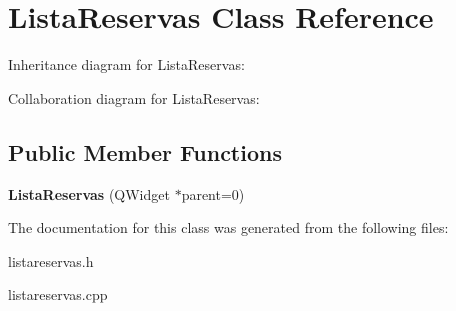 \hypertarget{classListaReservas}{}\section{Lista\+Reservas Class Reference}
\label{classListaReservas}


Inheritance diagram for Lista\+Reservas\+:


Collaboration diagram for Lista\+Reservas\+:
\subsection*{Public Member Functions}
\begin{DoxyCompactItemize}
\item 
{\bfseries Lista\+Reservas} (Q\+Widget $\ast$parent=0)\hypertarget{classListaReservas_ac68a4dbe8a07a1bae697ae98cb4a5fa4}{}\label{classListaReservas_ac68a4dbe8a07a1bae697ae98cb4a5fa4}

\end{DoxyCompactItemize}


The documentation for this class was generated from the following files\+:\begin{DoxyCompactItemize}
\item 
listareservas.\+h\item 
listareservas.\+cpp\end{DoxyCompactItemize}
